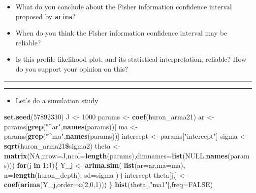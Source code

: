 \documentclass[]{article}
\newenvironment{Shaded}{\begin{snugshade}}{\end{snugshade}}
\newcommand{\KeywordTok}[1]{\textcolor[rgb]{0.13,0.29,0.53}{\textbf{#1}}}
\newcommand{\DataTypeTok}[1]{\textcolor[rgb]{0.13,0.29,0.53}{#1}}
\newcommand{\DecValTok}[1]{\textcolor[rgb]{0.00,0.00,0.81}{#1}}
\newcommand{\StringTok}[1]{\textcolor[rgb]{0.31,0.60,0.02}{#1}}
\newcommand{\OtherTok}[1]{\textcolor[rgb]{0.56,0.35,0.01}{#1}}
\newcommand{\ControlFlowTok}[1]{\textcolor[rgb]{0.13,0.29,0.53}{\textbf{#1}}}
\newcommand{\OperatorTok}[1]{\textcolor[rgb]{0.81,0.36,0.00}{\textbf{#1}}}
\newcommand{\NormalTok}[1]{#1}
\providecommand{\tightlist}{%
  \setlength{\itemsep}{0pt}\setlength{\parskip}{0pt}}
\begin{document}
\begin{itemize}
\item
  What do you conclude about the Fisher information confidence interval
  proposed by \texttt{arima}?
\item
  When do you think the Fisher information confidence interval may be
  reliable?
\item
  Is this profile likelihood plot, and its statistical interpretation,
  reliable? How do you support your opinion on this?
\end{itemize}

\begin{center}\rule{0.5\linewidth}{\linethickness}\end{center}

\begin{center}\rule{0.5\linewidth}{\linethickness}\end{center}

\begin{itemize}
\tightlist
\item
  Let's do a simulation study
\end{itemize}

\begin{Shaded}
\begin{Highlighting}[]
\KeywordTok{set.seed}\NormalTok{(}\DecValTok{57892330}\NormalTok{)}
\NormalTok{J <-}\StringTok{ }\DecValTok{1000}
\NormalTok{params <-}\StringTok{ }\KeywordTok{coef}\NormalTok{(huron_arma21)}
\NormalTok{ar <-}\StringTok{ }\NormalTok{params[}\KeywordTok{grep}\NormalTok{(}\StringTok{"^ar"}\NormalTok{,}\KeywordTok{names}\NormalTok{(params))]}
\NormalTok{ma <-}\StringTok{ }\NormalTok{params[}\KeywordTok{grep}\NormalTok{(}\StringTok{"^ma"}\NormalTok{,}\KeywordTok{names}\NormalTok{(params))]}
\NormalTok{intercept <-}\StringTok{ }\NormalTok{params[}\StringTok{"intercept"}\NormalTok{]}
\NormalTok{sigma <-}\StringTok{ }\KeywordTok{sqrt}\NormalTok{(huron_arma21}\OperatorTok{\$}\NormalTok{sigma2)}
\NormalTok{theta <-}\StringTok{ }\KeywordTok{matrix}\NormalTok{(}\OtherTok{NA}\NormalTok{,}\DataTypeTok{nrow=}\NormalTok{J,}\DataTypeTok{ncol=}\KeywordTok{length}\NormalTok{(params),}\DataTypeTok{dimnames=}\KeywordTok{list}\NormalTok{(}\OtherTok{NULL}\NormalTok{,}\KeywordTok{names}\NormalTok{(params)))}
\ControlFlowTok{for}\NormalTok{(j }\ControlFlowTok{in} \DecValTok{1}\OperatorTok{:}\NormalTok{J)\{}
\NormalTok{   Y_j <-}\StringTok{ }\KeywordTok{arima.sim}\NormalTok{(}
      \KeywordTok{list}\NormalTok{(}\DataTypeTok{ar=}\NormalTok{ar,}\DataTypeTok{ma=}\NormalTok{ma),}
      \DataTypeTok{n=}\KeywordTok{length}\NormalTok{(huron_depth),}
      \DataTypeTok{sd=}\NormalTok{sigma}
\NormalTok{   )}\OperatorTok{+}\NormalTok{intercept}
\NormalTok{   theta[j,] <-}\StringTok{ }\KeywordTok{coef}\NormalTok{(}\KeywordTok{arima}\NormalTok{(Y_j,}\DataTypeTok{order=}\KeywordTok{c}\NormalTok{(}\DecValTok{2}\NormalTok{,}\DecValTok{0}\NormalTok{,}\DecValTok{1}\NormalTok{)))}
\NormalTok{\}}
\KeywordTok{hist}\NormalTok{(theta[,}\StringTok{"ma1"}\NormalTok{],}\DataTypeTok{freq=}\OtherTok{FALSE}\NormalTok{) }
\end{Highlighting}
\end{Shaded}
\end{document}
